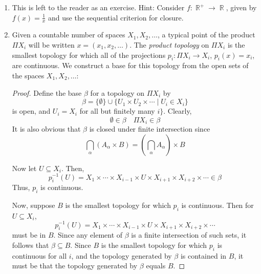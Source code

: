 \documentclass{book}
\DeclareMathOperator*{\R}{\mathbb{R}}
\begin{document}
\begin{enumerate}[(1)]
\begin{proof}
\begin{itemize}
                \item[] ($\impliedby$) Suppose that $\Delta(\{X\})$ is closed in $X \times X$. Now, if $(x,y) \notin \Delta(\{X\})$, then $(x,y) \in \Delta(\{X\}) ^ c$, which is open. And so, by definition of the topology on $X \times X$, there exist open sets $U, V$, such that 
                    \[(x,y) \in U \times V \subset \Delta(\{X\}) ^c\]
                    But, then 
                    \[ (U \times V)  \cap \Delta(\{X\}) = \emptyset,\]
                    implies $U \cap V = \emptyset$, by set theory. 
            \end{itemize}
        \end{proof}

    \item This is left to the reader as an exercise. Hint: Consider $f: \R^+ \rightarrow \R$, given by $f(x) = \frac{1}{x}$ and use the sequential criterion for closure. 

    \item Given a countable number of spaces $X_1, X_2,\dots$, a typical point of the product $\Pi X_i$ will be written $x=(x_1,x_2,\dots)$.  The {\it product topology} on $\Pi X_i$ is the smallest topology for which all of the projections $p_i:\Pi X_i\rightarrow X_i$, $p_i(x)=x_i$, are continuous. We construct a base for this topology from the open sets of the spaces $X_1, X_2,\dots$: 
        \begin{proof} Define the base $\beta$ for a topology on $\Pi X_i$ by 
            \[ \beta=\{\emptyset\}\cup\{U_1\times U_2\times \cdots \mid U_i\in X_i\} \] is open, and $U_i=X_i$ for all but finitely many $i\}$.  Clearly, 
            \[\emptyset\in\beta \quad \Pi X_i\in\beta\]
            It is also obvious that $\beta$ is closed under finite intersection since 
            \[ \bigcap_\alpha(A_\alpha\times B)=(\bigcap_\alpha A_\alpha)\times B\]
            \par Now let $U\subseteq X_i$. Then, 
            \[ p_i^{-1}(U)=X_1\times\cdots\times X_{i-1}\times U\times X_{i+1}\times X_{i+2}\times\cdots\in\beta\] 
            Thus, $p_i$ is continuous.
            \par Now, suppose $B$ is the smallest topology for which $p_i$ is continuous.  Then for $U\subseteq X_i$, \[p_i^{-1}(U)=X_1\times\cdots\times X_{i-1}\times U\times X_{i+1}\times X_{i+2}\times\cdots\] must be in $B$. Since any element of $\beta$ is a finite intersection of such sets, it follows that $\beta\subseteq B$.  Since $B$ is the smallest topology for which $p_i$ is continuous for all $i$, and the topology generated by $\beta$ is contained in $B$, it must be that the topology generated by $\beta$ equals $B$.
        \end{proof}


\end{enumerate}
\end{document}
